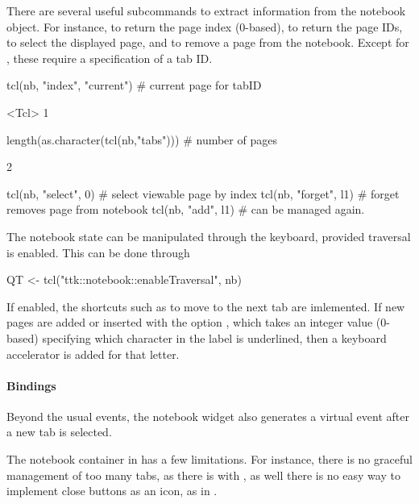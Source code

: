 There are several useful subcommands to extract information from the
notebook object.  For instance,  to return the page index
(0-based),  to return the page IDs,  to select
the displayed page, and  to remove a page from the
notebook. Except for , these require a specification of a
tab ID.
\begin{Schunk}
\begin{Sinput}
 tcl(nb, "index", "current")           # current page for tabID
\end{Sinput}
\begin{Soutput}
<Tcl> 1 
\end{Soutput}
\begin{Sinput}
 length(as.character(tcl(nb,"tabs")))  # number of pages
\end{Sinput}
\begin{Soutput}
[1] 2
\end{Soutput}
\begin{Sinput}
 tcl(nb, "select", 0)                  # select viewable page by index
 tcl(nb, "forget", l1)                 # forget removes page from notebook
 tcl(nb, "add", l1)                    # can be managed again.
\end{Sinput}
\end{Schunk}


The notebook state can be manipulated through the keyboard, provided traversal is enabled. This can be done through
\begin{Schunk}
\begin{Sinput}
 QT <- tcl("ttk::notebook::enableTraversal", nb)
\end{Sinput}
\end{Schunk}

If enabled, the shortcuts such as  to move to the
next tab are imlemented. If new pages are added or inserted with the
option , which takes an integer value
(0-based) specifying which character in the label is underlined, then
a keyboard accelerator is added for that letter.

\paragraph{Bindings}
Beyond the usual events, the notebook widget also generates a
 virtual event after a new tab is
selected.

The notebook container in \TK\/ has a few limitations. For instance,
there is no graceful management of too many tabs, as there is with
\GTK, as well there is no easy way to implement close buttons as an
icon, as in \Qt.


